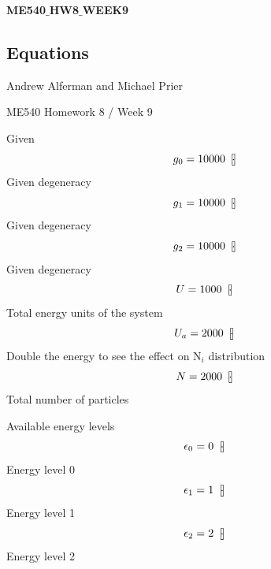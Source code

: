 \documentclass[10pt,fleqn]{article}
\begin{document}
\begin{center}
\bf \mbox{ME540$\_$HW8$\_$WEEK9}
\vspace{0.2 in}
\end{center}
\subsection*{Equations}

\vspace{0.10in}
\noindent
{\color{blue} \rm Andrew Alferman and Michael Prier}

\vspace{0.10in}
\noindent
{\color{blue} \rm ME540 Homework 8 / Week 9}

\vspace{0.10in}
\noindent
{\color{blue} \rm Given}
\begin{equation}
\label{EES Eqn:1}
g_{0} = 10000   \   \left[ \rm  \! \cdot \! \right]	 
\end{equation}
{\color{blue} \rm Given degeneracy}
\begin{equation}
\label{EES Eqn:2}
g_{1} = 10000   \   \left[ \rm  \! \cdot \! \right]	 
\end{equation}
{\color{blue} \rm Given degeneracy}
\begin{equation}
\label{EES Eqn:3}
g_{2} = 10000   \   \left[ \rm  \! \cdot \! \right]	 
\end{equation}
{\color{blue} \rm Given degeneracy}
\begin{equation}
\label{EES Eqn:4}
U = 1000   \   \left[ \rm  \! \cdot \! \right]	 
\end{equation}
{\color{blue} \rm Total energy units of the system}
\begin{equation}
\label{EES Eqn:5}
U_{a} = 2000   \   \left[ \rm  \! \cdot \! \right]	 
\end{equation}
{\color{blue} \rm Double the energy to see the effect on N$_{i}$ distribution}
\begin{equation}
\label{EES Eqn:6}
N = 2000   \   \left[ \rm  \! \cdot \! \right]	 
\end{equation}
{\color{blue} \rm Total number of particles}

\vspace{0.10in}
\noindent
{\color{blue} \rm Available energy levels}
\begin{equation}
\label{EES Eqn:7}
\epsilon_{0} = 0   \   \left[ \rm  \! \cdot \! \right]	 
\end{equation}
{\color{blue} \rm Energy level 0}
\begin{equation}
\label{EES Eqn:8}
\epsilon_{1} = 1   \   \left[ \rm  \! \cdot \! \right]	 
\end{equation}
{\color{blue} \rm Energy level 1}
\begin{equation}
\label{EES Eqn:9}
\epsilon_{2} = 2   \   \left[ \rm  \! \cdot \! \right]	 
\end{equation}
{\color{blue} \rm Energy level 2}
\end{document}
